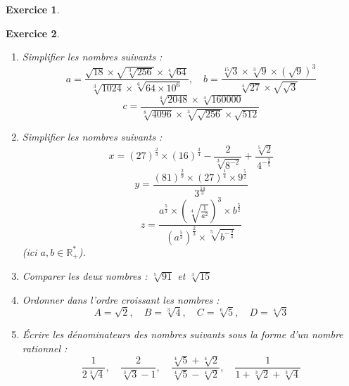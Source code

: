 \documentclass[12pt,a4paper]{article}
\theoremstyle{mystyle}
\newtheorem{exo}{Exercice}
\begin{document}
\begin{multicols*}{2}
\begin{exo}
\end{exo}


\begin{exo}
\text{ }
    \begin{enumerate}
    \item Simplifier les nombres suivants :
    \[
    a = \frac{\sqrt{18} \times \sqrt{\sqrt[3]{256}} \times \sqrt[4]{64}}{\sqrt[3]{1024} \times \sqrt[6]{64\times 10^6}}, \quad
    b = \frac{\sqrt[15]{3} \times \sqrt[3]{9} \times (\sqrt{9})^3}{\sqrt[4]{27} \times \sqrt{\sqrt{3}}}
    \]
    \[
    c = \frac{\sqrt[4]{2048} \times \sqrt[4]{160000}}{\sqrt[8]{4096} \times \sqrt[3]{\sqrt{256}} \times \sqrt{512}}
    \]

    \item Simplifier les nombres suivants :
    \[
    x = \left(27\right)^{\frac{2}{3}} \times \left(16\right)^{\frac{3}{4}} - \frac{2}{\sqrt[3]{8^{-2}}} + \frac{\sqrt[5]{2}}{4^{-\frac{2}{5}}}
    \]
    \[
    y = \frac{(81)^{\frac{2}{9}} \times \left(27\right)^{\frac{1}{4}} \times 9^{\frac{5}{2}}}{3^{\frac{14}{3}}}
    \]
    \[
    z = \frac{a^{\frac{5}{3}} \times \left(\sqrt[4]{\frac{1}{a^2}}\right)^3 \times b^{\frac{5}{2}}}{\left(a^{\frac{5}{3}}\right)^{\frac{2}{3}} \times \sqrt[5]{b^{-\frac{3}{4}}}}
    \]
    (ici \(a, b \in \mathbb{R}^*_{+}\)).

    \item Comparer les deux nombres : \(\sqrt[5]{91}\) et \(\sqrt[3]{15}\)

    \item Ordonner dans l’ordre croissant les nombres : 
    \[
    A = \sqrt{2}, \quad B = \sqrt[3]{4}, \quad C = \sqrt[6]{5}, \quad D = \sqrt[4]{3}
    \]

    \item Écrire les dénominateurs des nombres suivants sous la forme d’un nombre rationnel :
    \[
    \frac{1}{2 \sqrt[3]{4}}, \quad \frac{2}{\sqrt[3]{3} - 1}, \quad \frac{\sqrt[4]{5} + \sqrt[4]{2}}{\sqrt[4]{5} - \sqrt[4]{2}}, \quad \frac{1}{1 + \sqrt[3]{2} + \sqrt[3]{4}}
    \]
\end{enumerate}
\end{exo}


\end{multicols*}
\end{document}
